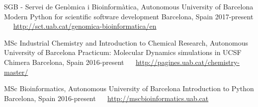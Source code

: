 


\begin{cventries}

  \cventry
    {SGB - Servei de Genòmica i Bioinformàtica, Autonomous University of Barcelona} %
    {Modern Python for scientific software development} %
    {Barcelona, Spain} %
    {2017-present} %
    {~~ \footnotesize{\href{http://sct.uab.cat/genomica-bioinformatica/en}{\faGlobe \acvHeaderIconSep http://sct.uab.cat/genomica-bioinformatica/en}}}

  \cventry
    {MSc Industrial Chemistry and Introduction to Chemical Research, Autonomous University of Barcelona} %
    {Practicum: Molecular Dynamics simulations in UCSF Chimera} %
    {Barcelona, Spain} %
    {2016-present} %
    {~~ \footnotesize{\href{http://pagines.uab.cat/chemistry-master}{\faGlobe \acvHeaderIconSep http://pagines.uab.cat/chemistry-master/}}}

  \cventry
    {MSc Bioinformatics, Autonomous University of Barcelona} %
    {Introduction to Python} %
    {Barcelona, Spain} %
    {2016-present} %
    {~~ \footnotesize{\href{http://mscbioinformatics.uab.cat}{\faGlobe \acvHeaderIconSep http://mscbioinformatics.uab.cat}}}

\end{cventries}
